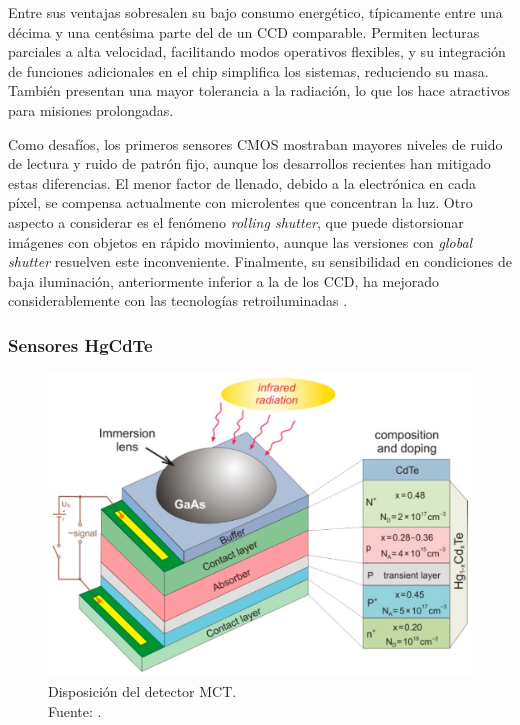 Entre sus ventajas sobresalen su bajo consumo energético, típicamente entre una décima y una centésima parte del de un CCD comparable. Permiten lecturas parciales a alta velocidad, facilitando modos operativos flexibles, y su integración de funciones adicionales en el chip simplifica los sistemas, reduciendo su masa. También presentan una mayor tolerancia a la radiación, lo que los hace atractivos para misiones prolongadas.

Como desafíos, los primeros sensores CMOS mostraban mayores niveles de ruido de lectura y ruido de patrón fijo, aunque los desarrollos recientes han mitigado estas diferencias. El menor factor de llenado, debido a la electrónica en cada píxel, se compensa actualmente con microlentes que concentran la luz. Otro aspecto a considerar es el fenómeno \textit{rolling shutter}, que puede distorsionar imágenes con objetos en rápido movimiento, aunque las versiones con \textit{global shutter} resuelven este inconveniente. Finalmente, su sensibilidad en condiciones de baja iluminación, anteriormente inferior a la de los CCD, ha mejorado considerablemente con las tecnologías retroiluminadas \cite{kuroda_essential_2014}.

\subsubsection{Sensores HgCdTe}

\begin{figure}[H]
    \centering
    \includegraphics[width=0.5\linewidth]{3.Conceptos_Previos/coatings-11-00611-g002-2725805712.png}
    \caption{Disposición del detector MCT.\\Fuente: \cite{coatings2021_11_5_611_extended}.}
    \label{fig:enter-label}
\end{figure}

